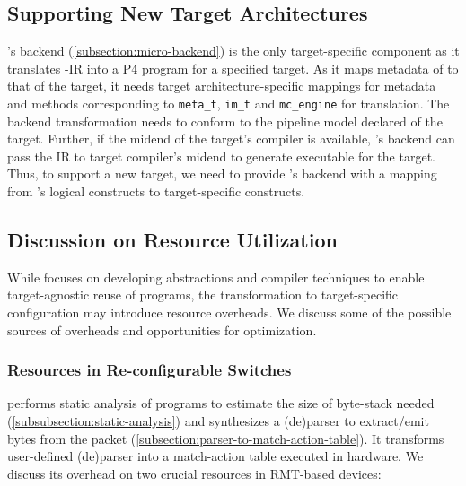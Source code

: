 \documentclass[letterpaper,twocolumn,10pt]{article}
\begin{document}





\subsection{Supporting New Target Architectures}
\label{sec:new-target}
 \ucomp's  backend
(\cref{subsection:micro-backend}) is the only target-specific
component as it translates \uarch-IR into a P4 program for a
specified target. As it maps metadata of \uarch to that of the target,
it needs target architecture-specific mappings for metadata and
methods corresponding to \texttt{meta\_t}, \texttt{im\_t} and
\texttt{mc\_engine} for translation. The backend transformation needs
to conform to the pipeline model declared of the target. Further, if
the midend of the target's compiler is available, \ucomp's backend can
pass the IR to target compiler's midend to generate executable for the
target. Thus, to support a new target, we need to provide \ucomp's
backend with a mapping from \uarch's logical constructs to
target-specific constructs. 

\subsection{Discussion on Resource Utilization}
\label{sec:overheads}
While \ulang focuses on developing abstractions and compiler
techniques to enable target-agnostic reuse of programs, the
transformation to target-specific configuration may introduce resource
overheads. We discuss some of the possible sources of overheads and
opportunities for optimization.

\subsubsection{Resources in Re-configurable Switches}
\ucomp performs static analysis of \ulang programs to estimate the
size of byte-stack needed (\cref{subsubsection:static-analysis}) and 
synthesizes
a (de)parser to extract/emit bytes from the packet
(\cref{subsection:parser-to-match-action-table}). It transforms
user-defined (de)parser into a match-action table executed in
hardware. We discuss its overhead on two crucial resources in
RMT-based devices:
\end{document}
